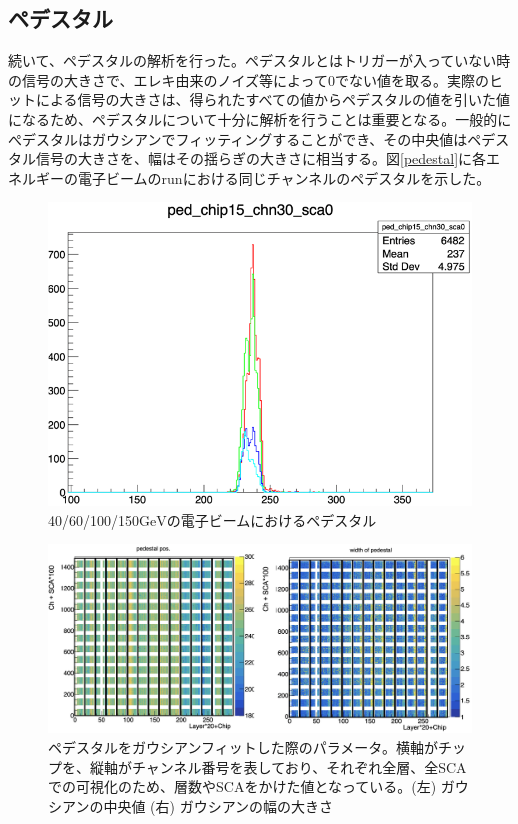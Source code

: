 \subsection{ペデスタル}
続いて、ペデスタルの解析を行った。ペデスタルとはトリガーが入っていない時の信号の大きさで、エレキ由来のノイズ等によって0でない値を取る。実際のヒットによる信号の大きさは、得られたすべての値からペデスタルの値を引いた値になるため、ペデスタルについて十分に解析を行うことは重要となる。一般的にぺデスタルはガウシアンでフィッティングすることができ、その中央値はペデスタル信号の大きさを、幅はその揺らぎの大きさに相当する。図\ref{pedestal}に各エネルギーの電子ビームのrunにおける同じチャンネルのペデスタルを示した。\\
\begin{figure}[H]
\begin{center}
 \includegraphics[keepaspectratio, scale=0.5]
 	{Figure/Beamtest/pedestal.png}
 		\caption{40/60/100/150$\mathrm{GeV}$の電子ビームにおけるペデスタル}
		\label{monitor}
\end{center}
\end{figure}
\begin{figure}[H]
\begin{center}
 \includegraphics[keepaspectratio, scale=0.3]
 	{Figure/Beamtest/ped_pos.png}
 		\caption{ペデスタルをガウシアンフィットした際のパラメータ。横軸がチップを、縦軸がチャンネル番号を表しており、それぞれ全層、全SCAでの可視化のため、層数やSCAをかけた値となっている。(左) ガウシアンの中央値 (右) ガウシアンの幅の大きさ}
		\label{monitor}
\end{center}
\end{figure}


